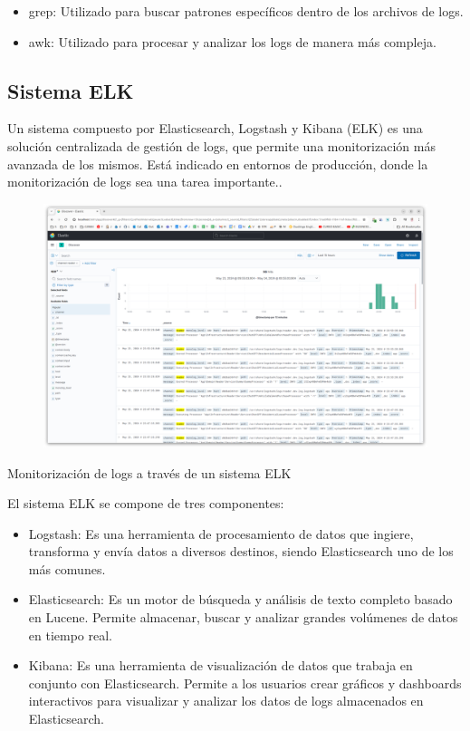 \begin{itemize}
    \item grep: Utilizado para buscar patrones específicos dentro de los archivos de logs.
    \item awk: Utilizado para procesar y analizar los logs de manera más compleja.
\end{itemize}

\subsection*{Sistema ELK}
Un sistema compuesto por Elasticsearch, Logstash y Kibana (ELK) es una solución centralizada de gestión de logs, que permite una monitorización más avanzada de los mismos. Está indicado en entornos de producción, donde la monitorización de logs sea una tarea importante..

\begin{figure}
    \centering
    \includegraphics{./chapter/4/images/ad_4nxfpsnvodkc7h22x01w50v3bkprgygytiefngbdo_5-klldgxdain9x4rosk0987vpy0mkcu0gyf_art6d6y0vaw5ux1zclk}
    \caption{}
    \label{fig:ad_4nxfpsnvodkc7h22x01w50v3bkprgygytiefngbdo_5-klldgxdain9x4rosk0987vpy0mkcu0gyf_art6d6y0vaw5ux1zclk}
\end{figure}

Monitorización de logs a través de un sistema ELK

El sistema ELK se compone de tres componentes:

\begin{itemize}
    \item Logstash: Es una herramienta de procesamiento de datos que ingiere, transforma y envía datos a diversos destinos, siendo Elasticsearch uno de los más comunes.
    \item Elasticsearch: Es un motor de búsqueda y análisis de texto completo basado en Lucene. Permite almacenar, buscar y analizar grandes volúmenes de datos en tiempo real.
    \item Kibana: Es una herramienta de visualización de datos que trabaja en conjunto con Elasticsearch. Permite a los usuarios crear gráficos y dashboards interactivos para visualizar y analizar los datos de logs almacenados en Elasticsearch.
\end{itemize}

